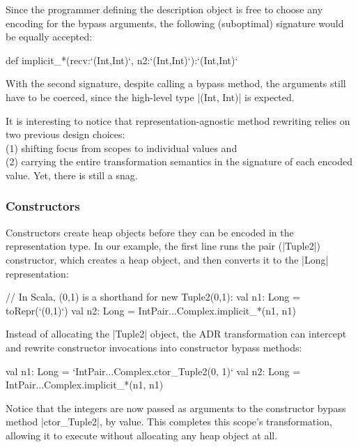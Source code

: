 Since the programmer defining the description object is free to choose any encoding for the bypass arguments, the following (suboptimal) signature would be equally accepted:

\begin{lstlisting-nobreak}
def implicit_*(recv:`(Int,Int)`, n2:`(Int,Int)`):`(Int,Int)`
\end{lstlisting-nobreak}

With the second signature, despite calling a bypass method, the arguments still have to be coerced, since the high-level type |(Int, Int)| is expected.

It is interesting to notice that representation-agnostic method rewriting relies on two previous design choices: \\
(1) shifting focus from scopes to individual values and \\
(2) carrying the entire transformation semantics in the signature of each encoded value.
Yet, there is still a snag.


\subsubsection*{Constructors}

Constructors create heap objects before they can be encoded in the representation type. In our example, the first line runs the pair (|Tuple2|) constructor, which creates a heap object, and then converts it to the |Long| representation:

\begin{lstlisting-nobreak}
// In Scala, (0,1) is a shorthand for new Tuple2(0,1):
val n1: Long = toRepr(`(0,1)`)
val n2: Long = IntPair...Complex.implicit_*(n1, n1)
\end{lstlisting-nobreak}

Instead of allocating the |Tuple2| object, the ADR transformation can intercept and rewrite constructor invocations into constructor bypass methods:

\begin{lstlisting-nobreak}
val n1: Long = `IntPair...Complex.ctor_Tuple2(0, 1)`
val n2: Long = IntPair...Complex.implicit_*(n1, n1)
\end{lstlisting-nobreak}

Notice that the integers are now passed as arguments to the constructor bypass method |ctor_Tuple2|, by value. This completes this scope's transformation, allowing it to execute without allocating any heap object at all.


